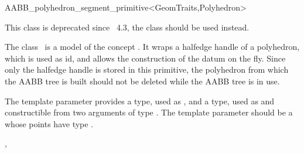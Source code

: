 \ccRefPageBegin


\begin{ccRefClass}{AABB_polyhedron_segment_primitive<GeomTraits,Polyhedron>}


This class is deprecated since \cgal\ 4.3, the class  should be used instead.

\begin{ccDeprecated}

\ccDefinition
  
The class \ccRefName\ is a model of the concept . It wraps a halfedge handle of a polyhedron, which is used as id, and allows the construction of the datum on the fly. Since only the halfedge handle is stored in this primitive, the polyhedron from which the AABB tree is built should not be deleted while the AABB tree is in use.

\ccParameters
The template parameter  provides a  type, used as , and a  type, used as  and constructible from two arguments of type . The template parameter  should be a  whose points have type .


\ccTypes
{}
\ccGlue
{}

\ccSeeAlso

,\\
\\
\end{ccDeprecated}

\end{ccRefClass}


\ccRefPageEnd

